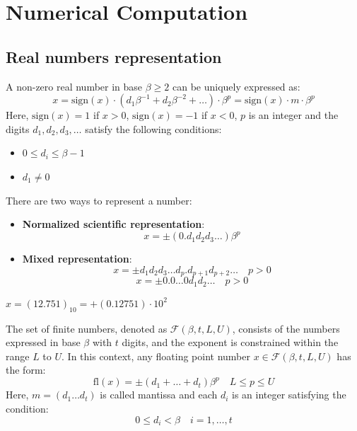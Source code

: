 \documentclass{article}
\begin{document}

\tableofcontents
\clearpage

\parindent 0pt

\section{Numerical Computation}
\subsection{Real numbers representation}
\begin{theorem}
    A non-zero real number in base $\beta\geq2$ can be uniquely expressed as:
    $$x=\text{sign}(x)\cdot(d_1\beta^{-1}+d_2\beta^{-2}+\ldots)\cdot\beta^p=\text{sign}(x)\cdot
    m\cdot\beta^p$$
    Here, $\text{sign}(x)=1$ if $x>0$, $\text{sign}(x)=-1$ if $x<0$, $p$ is an
    integer and the digits $d_1,d_2,d_3,\ldots$ satisfy the following
    conditions:
\end{theorem}
\begin{itemize}
    \item $0\leq d_i\leq\beta-1$
    \item $d_1\neq0$
\end{itemize}
There are two ways to represent a number:
\begin{itemize}
    \item \textbf{Normalized scientific representation}:
        $$x=\pm(0.d_1d_2d_3\ldots)\beta^p$$
    \item \textbf{Mixed representation}: 
        $$x=\pm d_1d_2d_3\ldots d_p.d_{p+1}d_{p+2}\ldots\quad p>0$$
        $$x=\pm 0.0\ldots0d_1d_2\ldots \quad p>0$$
\end{itemize}
\begin{example}
    $x=(12.751)_{10}=+(0.12751)\cdot10^2$ 
\end{example}
\begin{definition}
    The set of finite numbers, denoted as $\mathcal{F}(\beta,t,L,U)$, consists
    of the numbers expressed in base $\beta$ with $t$ digits, and the exponent
    is constrained within the range $L$ to $U$. In this context, any floating
    point number $x\in\mathcal{F}(\beta,t,L,U)$ has the form: 
    $$\text{fl}(x)=\pm(d_1+\ldots+d_t)\beta^p\quad L\leq p\leq U$$
    Here, $m=(d_1\ldots d_t)$ is called mantissa and 
    each $d_i$ is an integer satisfying the condition: 
    $$0\leq d_i<\beta\quad i=1,\ldots,t$$
\end{definition}
\end{document}
